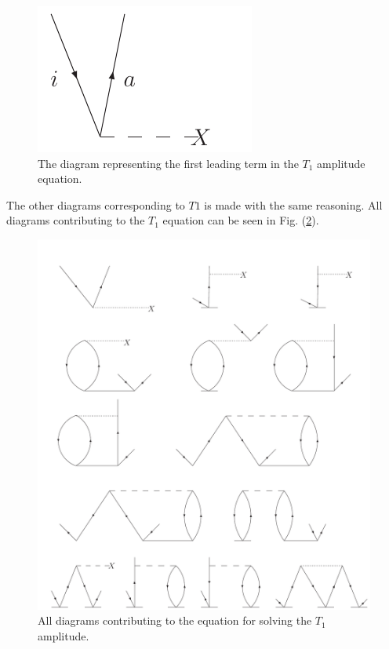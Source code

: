 \begin{figure}[htp]
\centering
\includegraphics[scale=0.75]{firstampl}
\caption{The diagram representing the first leading term in the
$T_1$ amplitude equation.}
\label{firstamplt1}
\end{figure}

The other diagrams corresponding to $T1$ is made with the same reasoning. 
All diagrams contributing to the $T_1$ equation can be seen in Fig. (\ref{t1_eqn_diag}).\\


\begin{figure}[htp]
\centering
\includegraphics[scale=0.5]{t1_eqn_diag}
\caption{All diagrams contributing to the equation for solving the
$T_1$ amplitude.}
\label{t1_eqn_diag}
\end{figure}

